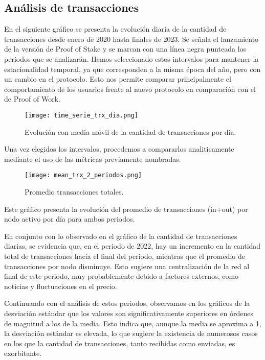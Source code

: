 \documentclass{article}
\begin{document}
\subsection{Análisis de transacciones}
En el siguiente gráfico se presenta la evolución diaria de la cantidad de transacciones desde enero de 2020 hasta finales de 2023. Se señala el lanzamiento de la versión de Proof of Stake y se marcan con una línea negra punteada los periodos que se analizarán. Hemos seleccionado estos intervalos para mantener la estacionalidad temporal, ya que corresponden a la misma época del año, pero con un cambio en el protocolo. Esto nos permite comparar principalmente el comportamiento de los usuarios frente al nuevo protocolo en comparación con el de Proof of Work.
\begin{figure}[h!]
    \centering
    \texttt{[image: time\_serie\_trx\_dia.png]} %
    \caption{Evolución con media móvil de la cantidad de transacciones por dia.}
    \label{fig:ejemplo}
\end{figure}

Una vez elegidos los intervalos, procedemos a compararlos analiticamente mediante el uso de las métricas previamente nombradas.



\begin{wrapfigure}{l}{0.65\textwidth} %
    \centering
    
    \texttt{[image: mean\_trx\_2\_periodos.png]} %
    \caption{Promedio transacciones totales.}
    \label{fig:ejemplo}
\end{wrapfigure}

Este gráfico presenta la evolución del promedio de transacciones (in+out) por nodo activo por día para ambos periodos. 

En conjunto con lo observado en el gráfico de la cantidad de transacciones diarias, se evidencia que, en el periodo de 2022, hay un incremento en la cantidad total de transacciones hacia el final del periodo, mientras que el promedio de transacciones por nodo disminuye. Esto sugiere una centralización de la red al final de este periodo, muy probablemente debido a factores externos, como noticias y fluctuaciones en el precio.



Continuando con el análisis de estos periodos, observamos en los gráficos de la desviación estándar que los valores son significativamente superiores en órdenes de magnitud a los de la media. Esto indica que, aunque la media se aproxima a 1, la desviación estándar es elevada, lo que sugiere la existencia de numerosos casos en los que la cantidad de transacciones, tanto recibidas como enviadas, es exorbitante. 
\end{document}

